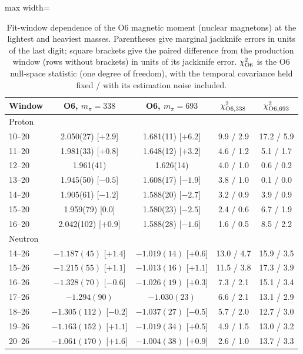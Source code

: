 \documentclass[aps,prd,reprint,twocolumn,superscriptaddress,nofootinbib,longbibliography]{revtex4-2}
\begin{document}
\begin{table}[t]
\caption{Fit-window dependence of the O6 magnetic moment (nuclear magnetons) at the lightest and heaviest masses. Parentheses give marginal jackknife errors in units of the last digit; square brackets give the paired difference from the production window (rows without brackets) in units of its jackknife error. $\chi^2_{\rm O6}$ is the O6 null-space statistic (one degree of freedom), with the temporal covariance held fixed / with its estimation noise included.}
\label{tab:windows}
\centering
\begin{adjustbox}{max width=\columnwidth}
\begin{tabular}{lcccc}
\toprule
Window & O6, $m_\pi=338$ & O6, $m_\pi=693$ & $\chi^2_{{\rm O6},338}$ & $\chi^2_{{\rm O6},693}$\\
\midrule
\multicolumn{5}{l}{Proton}\\
10--20 & 2.050(27) [$+2.9$] & 1.681(11) [$+6.2$] & 9.9 / 2.9 & 17.2 / 5.9\\
11--20 & 1.981(33) [$+0.8$] & 1.648(12) [$+3.2$] & 4.6 / 1.2 & 5.1 / 1.7\\
12--20 & 1.961(41) & 1.626(14) & 4.0 / 1.0 & 0.6 / 0.2\\
13--20 & 1.945(50) [$-0.5$] & 1.608(17) [$-1.9$] & 3.8 / 1.0 & 0.1 / 0.0\\
14--20 & 1.905(61) [$-1.2$] & 1.588(20) [$-2.7$] & 3.2 / 0.9 & 3.9 / 0.9\\
15--20 & 1.959(79) [$0.0$] & 1.580(23) [$-2.5$] & 2.4 / 0.6 & 6.7 / 1.9\\
16--20 & 2.042(102) [$+0.9$] & 1.588(28) [$-1.6$] & 1.6 / 0.5 & 8.5 / 2.2\\
\multicolumn{5}{l}{Neutron}\\
14--26 & $-1.187(45)$ [$+1.4$] & $-1.019(14)$ [$+0.6$] & 13.0 / 4.7 & 15.9 / 3.5\\
15--26 & $-1.215(55)$ [$+1.1$] & $-1.013(16)$ [$+1.1$] & 11.5 / 3.8 & 17.3 / 3.9\\
16--26 & $-1.328(70)$ [$-0.6$] & $-1.026(19)$ [$+0.3$] & 7.3 / 2.1 & 15.1 / 3.4\\
17--26 & $-1.294(90)$ & $-1.030(23)$ & 6.6 / 2.1 & 13.1 / 2.9\\
18--26 & $-1.305(112)$ [$-0.2$] & $-1.037(27)$ [$-0.5$] & 5.7 / 2.0 & 12.7 / 3.0\\
19--26 & $-1.163(152)$ [$+1.1$] & $-1.019(34)$ [$+0.5$] & 4.9 / 1.5 & 13.0 / 3.2\\
20--26 & $-1.061(170)$ [$+1.6$] & $-1.004(38)$ [$+0.9$] & 2.6 / 1.0 & 13.7 / 3.3\\
\bottomrule
\end{tabular}
\end{adjustbox}
\end{table}
\end{document}
